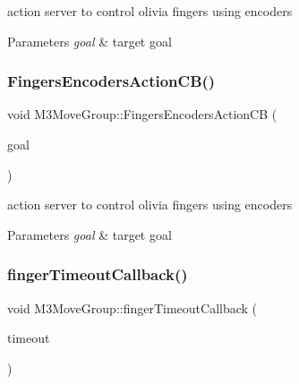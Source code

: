 action server to control olivia fingers using encoders 


\begin{DoxyParams}{Parameters}
{\em goal} & target goal \\
\hline
\end{DoxyParams}
\mbox{\label{classM3MoveGroup_ab202574f8621d26c6369c1b794014251}} 
\subsubsection{\texorpdfstring{Fingers\+Encoders\+Action\+C\+B()}{FingersEncodersActionCB()}\hspace{0.1cm}{\footnotesize\ttfamily [2/2]}}
{\footnotesize\ttfamily void M3\+Move\+Group\+::\+Fingers\+Encoders\+Action\+CB (\begin{DoxyParamCaption}\item[{const m3\+\_\+moveit\+::\+Moveit\+Fingers\+Goal\+Const\+Ptr \&}]{goal }\end{DoxyParamCaption})\hspace{0.3cm}{\ttfamily [inline]}}



action server to control olivia fingers using encoders 


\begin{DoxyParams}{Parameters}
{\em goal} & target goal \\
\hline
\end{DoxyParams}
\mbox{\label{classM3MoveGroup_a754821f89a28e5b3e6924d9f9e040946}} 
\subsubsection{\texorpdfstring{finger\+Timeout\+Callback()}{fingerTimeoutCallback()}\hspace{0.1cm}{\footnotesize\ttfamily [1/2]}}
{\footnotesize\ttfamily void M3\+Move\+Group\+::finger\+Timeout\+Callback (\begin{DoxyParamCaption}\item[{const std\+\_\+msgs\+::\+Bool}]{timeout }\end{DoxyParamCaption})\hspace{0.3cm}{\ttfamily [inline]}}




